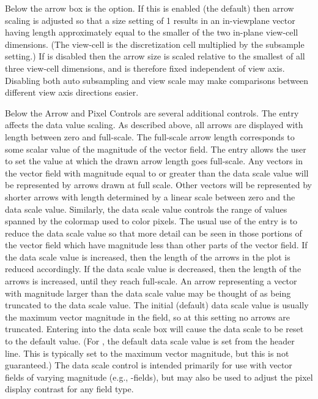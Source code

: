Below the arrow  box is the  option. If this
is enabled (the default) then arrow scaling is adjusted so that a size
setting of 1 results in an in-viewplane vector having length
approximately equal to the smaller of the two in-plane view-cell
dimensions. (The view-cell is the discretization cell multiplied by the
subsample setting.) If  is disabled then the arrow size
is scaled relative to the smallest of all three view-cell dimensions,
and is therefore fixed independent of view axis. Disabling both auto
subsampling and view scale may make comparisons between different view
axis directions easier.

Below the Arrow and Pixel Controls are several additional controls.  The
\label{HTMLmmdispdatascale} entry
affects the data value scaling.  As described above, all arrows are
displayed with length between zero and full-scale.  The full-scale arrow
length corresponds to some scalar value of the magnitude of the vector
field.  The  entry allows the user to
set the value at which the drawn arrow length goes full-scale.  Any
vectors in the vector field with magnitude equal to or greater than the
data scale value will be represented by arrows drawn at full scale.
Other vectors will be represented by shorter arrows with length
determined by a linear scale between zero and the data scale value.
Similarly, the data scale value controls the range of values spanned by
the colormap used to color pixels.  The usual use of the
 entry is to reduce the data
scale value so that more detail can be seen in those portions of
the vector field which have magnitude less than other parts of the
vector field.
If the data scale value is increased, then the length of the
arrows in the plot is reduced accordingly.  If the data scale value is
decreased, then the length of the arrows is increased, until they
reach full-scale.
An arrow representing a vector with magnitude larger than the
data scale value may be thought of as being truncated to the data scale
value.  The initial (default) data scale value is usually the maximum
vector magnitude in the field, so at this setting no arrows are
truncated.  Entering  into the data scale box will cause the data
scale to be reset to the default value.  (For ,
the default data scale value is set from the \cd{ValueRangeMaxMag}
header line.  This is typically set to the maximum vector magnitude, but
this is not guaranteed.)  The data scale control is intended primarily
for use with vector fields of varying magnitude (e.g., \vH -fields), but
may also be used to adjust the pixel display contrast for any field
type.

